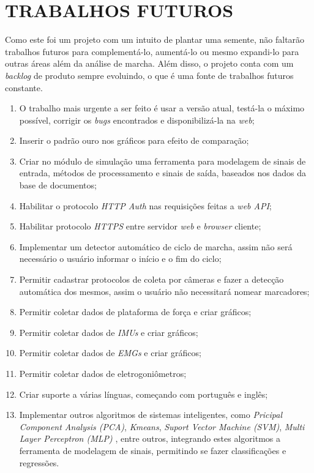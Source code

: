\chapter[TRABALHOS FUTUROS]{\textbf{TRABALHOS FUTUROS}}
Como este foi um projeto com um intuito de plantar uma semente, não faltarão trabalhos futuros para complementá-lo, aumentá-lo ou mesmo expandi-lo para outras áreas além da análise de marcha. Além disso, o projeto conta com um \emph{backlog} de produto sempre evoluindo, o que é uma fonte de trabalhos futuros constante.
\begin{enumerate}
	\item O trabalho mais urgente a ser feito é usar a versão atual, testá-la o máximo possível, corrigir os \emph{bugs} encontrados e disponibilizá-la na \emph{web};
	\item Inserir o padrão ouro nos gráficos para efeito de comparação;
	\item Criar no módulo de simulação uma ferramenta para modelagem de sinais de entrada, métodos de processamento e sinais de saída, baseados nos dados da base de documentos;
	\item Habilitar o protocolo \emph{HTTP Auth} nas requisições feitas a \emph{web API};
	\item Habilitar protocolo \emph{HTTPS} entre servidor \emph{web} e \emph{browser} cliente;
	\item Implementar um detector automático de ciclo de marcha, assim não será necessário o usuário informar o início e o fim do ciclo;
	\item Permitir cadastrar protocolos de coleta por câmeras e fazer a detecção automática dos mesmos, assim o usuário não necessitará nomear marcadores;
	\item Permitir coletar dados de plataforma de força e criar gráficos;
	\item Permitir coletar dados de \emph{IMUs} e criar gráficos;
	\item Permitir coletar dados de \emph{EMGs} e criar gráficos;
	\item Permitir coletar dados de eletrogoniômetros;
	\item Criar suporte a várias línguas, começando com português e inglês;
	\item Implementar outros algoritmos de sistemas inteligentes, como \emph{Pricipal Component Analysis (PCA)}, \emph{Kmeans}, \emph{Suport Vector Machine (SVM)}, \emph{Multi Layer Perceptron (MLP)} \cite{Haykin1998}, entre outros, integrando estes algoritmos a ferramenta de modelagem de sinais, permitindo se fazer classificações e regressões. 

\end{enumerate}
